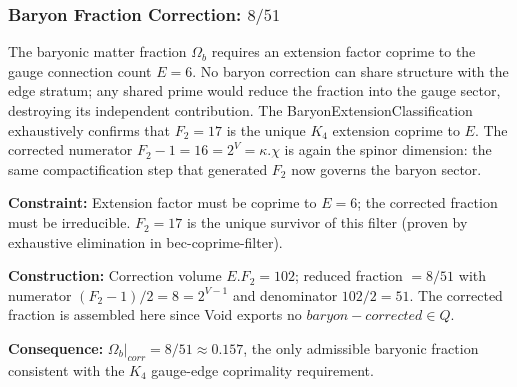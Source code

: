 \documentclass[11pt,a4paper]{book}
\def\cdot{.}%
\def\mathrm#1{#1}%
\def\mathbb#1{#1}%
\def\texttt#1{#1}%
\begin{document}
\subsubsection*{Baryon Fraction Correction: $8/51$}

The baryonic matter fraction $\Omega_b$ requires an extension factor coprime to the
gauge connection count $E = 6$.  No baryon correction can share structure with the
edge stratum; any shared prime would reduce the fraction into the gauge sector,
destroying its independent contribution.  The \texttt{BaryonExtensionClassification}
exhaustively confirms that $F_2 = 17$ is the unique $K_4$ extension coprime to $E$.
The corrected numerator $F_2 - 1 = 16 = 2^V = \kappa \cdot \chi$ is again the spinor
dimension: the same compactification step that generated $F_2$ now governs the baryon sector.

\medskip
\noindent
\textbf{Constraint:}
Extension factor must be coprime to $E = 6$; the corrected fraction must be irreducible.
$F_2 = 17$ is the unique survivor of this filter (proven by exhaustive elimination in
\texttt{bec-coprime-filter}).

\noindent
\textbf{Construction:}
Correction volume $E \cdot F_2 = 102$; reduced fraction $= 8/51$ with numerator
$(F_2 - 1)/2 = 8 = 2^{V-1}$ and denominator $102/2 = 51$.  The corrected
fraction is assembled here since Void exports no $\texttt{baryon-corrected} \in \mathbb{Q}$.

\noindent
\textbf{Consequence:}
$\Omega_b|_{\mathrm{corr}} = 8/51 \approx 0.157$, the only admissible baryonic
fraction consistent with the $K_4$ gauge-edge coprimality requirement.
\end{document}
